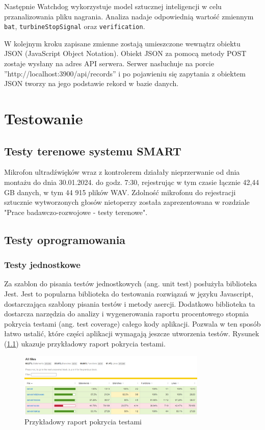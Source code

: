 \documentclass{sprz}
\begin{document}
Następnie Watchdog wykorzystuje model sztucznej inteligencji w celu przanalizowania pliku nagrania. Analiza nadaje odpowiednią wartość zmiennym \verb|bat|, \verb|turbineStopSignal| oraz \verb|verification|.

W kolejnym kroku zapisane zmienne zostają umieszczone wewnątrz obiektu JSON (JavaScript Object Notation). Obiekt JSON za pomocą metody POST zostaje wysłany na adres API serwera. Serwer nasłuchuje na porcie ”http://localhost:3900/api/records” i po pojawieniu się zapytania z obiektem JSON tworzy na jego podstawie rekord w bazie danych.

\chapter{Testowanie}

\section{Testy terenowe systemu SMART}
Mikrofon ultradźwięków wraz z kontrolerem działały nieprzerwanie od dnia montażu do dnia 30.01.2024. do godz. 7:30, rejestrując w tym czasie łącznie 42,44 GB danych, w tym 44 915 plików WAV.
Zdolność mikrofonu do rejestracji sztucznie wytworzonych głosów nietoperzy została zaprezentowana w rozdziale "Prace badawczo-rozwojowe - testy terenowe".

\section{Testy oprogramowania}

\subsection{Testy jednostkowe}

Za szablon do pisania testów jednostkowych (ang. unit test) posłużyła biblioteka Jest. Jest to popularna biblioteka do testowania rozwiązań w języku Javascript, dostarczająca szablony pisania testów i metody asercji. Dodatkowo biblioteka ta dostarcza narzędzia do analizy i wygenerowania raportu procentowego stopnia pokrycia testami (ang. test coverage) całego kody aplikacji. Pozwala w ten sposób łatwo ustalić, które części aplikacji wymagają jeszcze utworzenia testów. Rysunek (\ref{img:test_coverage}) ukazuje przykładowy raport pokrycia testami.

\begin{figure}[h]
  \centering
  \includegraphics[width=0.8\textwidth]{sprz/test_coverage}
  \caption{Przykładowy raport pokrycia testami}
  \label{img:test_coverage}
\end{figure}
\end{document}
